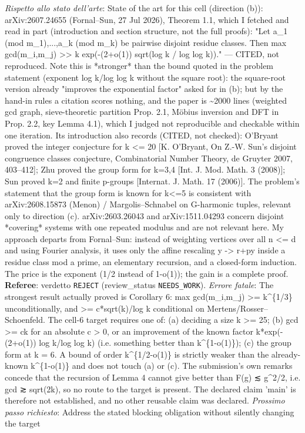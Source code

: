 \documentclass[11pt,a4paper]{article}
\begin{document}
\begin{description}
\emph{Rispetto allo stato dell'arte}: State of the art for this cell (direction (b)): arXiv:2607.24655 (Fornal–Sun, 27 Jul 2026), Theorem 1.1, which I fetched and read in part (introduction and section structure, not the full proofs): "Let a\_1 (mod m\_1),...,a\_k (mod m\_k) be pairwise disjoint residue classes. Then max gcd(m\_i,m\_j) \textgreater{}\textgreater{} k exp(-(2+o(1)) sqrt(log k / log log k))." — CITED, not reproduced. Note this is *stronger* than the bound quoted in the problem statement (exponent log k/log log k without the square root): the square-root version already "improves the exponential factor" asked for in (b); but by the hand-in rules a citation scores nothing, and the paper is \textasciitilde{}2000 lines (weighted gcd graph, sieve-theoretic partition Prop. 2.1, Möbius inversion and DFT in Prop. 2.2, key Lemma 4.1), which I judged not reproducible and checkable within one iteration. Its introduction also records (CITED, not checked): O'Bryant proved the integer conjecture for k \textless{}= 20 [K. O'Bryant, On Z.-W. Sun's disjoint congruence classes conjecture, Combinatorial Number Theory, de Gruyter 2007, 403–412]; Zhu proved the group form for k=3,4 [Int. J. Mod. Math. 3 (2008)]; Sun proved k=2 and finite p-groups [Internat. J. Math. 17 (2006)]. The problem's statement that the group form is known for k\textless{}=5 is consistent with arXiv:2608.15873 (Menon) / Margolis–Schnabel on G-harmonic tuples, relevant only to direction (c). arXiv:2603.26043 and arXiv:1511.04293 concern disjoint *covering* systems with one repeated modulus and are not relevant here. My approach departs from Fornal–Sun: instead of weighting vertices over all n \textless{}= d and using Fourier analysis, it uses only the affine rescaling y -\textgreater{} r+py inside a residue class mod a prime, an elementary recursion, and a closed-form induction. The price is the exponent (1/2 instead of 1-o(1)); the gain is a complete proof.
\textbf{Referee}: verdetto \texttt{REJECT} (review\_status \texttt{NEEDS\_WORK}).
\emph{Errore fatale}: The strongest result actually proved is Corollary 6: max gcd(m\_i,m\_j) \textgreater{}= k\textasciicircum{}\{1/3\} unconditionally, and \textgreater{}= c*sqrt(k)/log k conditional on Mertens/Rosser–Schoenfeld. The cell-6 target requires one of: (a) deciding a size k \textgreater{}= 25; (b) gcd \textgreater{}= ck for an absolute c \textgreater{} 0, or an improvement of the known factor k*exp(-(2+o(1)) log k/log log k) (i.e. something better than k\textasciicircum{}\{1-o(1)\}); (c) the group form at k = 6. A bound of order k\textasciicircum{}\{1/2-o(1)\} is strictly weaker than the already-known k\textasciicircum{}\{1-o(1)\} and does not touch (a) or (c). The submission's own remarks concede that the recursion of Lemma 4 cannot give better than F(g) ≲ g\textasciicircum{}2/2, i.e. gcd ≳ sqrt(2k), so no route to the target is present. The declared claim 'main' is therefore not established, and no other reusable claim was declared.
\emph{Prossimo passo richiesto}: Address the stated blocking obligation without silently changing the target
\end{description}
\end{document}
